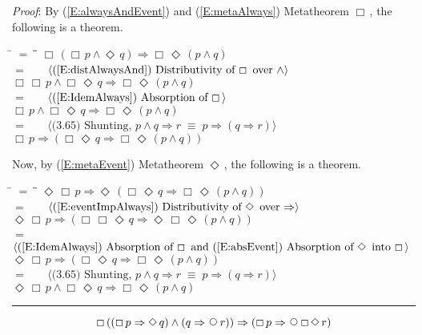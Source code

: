 \documentclass[12pt, fleqn, leqno]{article}
\newcommand{\lgap}{2pt}                             %
\newcommand{\mymathindent}{24pt}                    %
\newcommand{\equivs}{\ensuremath{\;\equiv\;}}       %
\newcommand{\impl}{\ensuremath{\Rightarrow}}        %
\newcommand{\Next}{\;\,\text{\raisebox{3.5pt}{\circle{6}}}}
\newcommand{\Event}{\Diamond\,}
\newcommand{\Always}{\Box\,}
\newcommand{\myqed}{\rule[-.23ex]{1.2ex}{2.0ex}}
\newcommand{\myqedtab}{\hspace{384pt}}              %
\newcommand{\Gll} {\langle}                         %
\newcommand{\Ggg} {\rangle}                         %
\newcommand{\Hint}[1]     {\ \ \ $\Gll              \mbox{#1} \Ggg$ }   %
\begin{document}
\emph{Proof}: By (\ref{E:alwaysAndEvent}) and (\ref{E:metaAlways}) Metatheorem $\Always$, the following is a theorem.
\begin{tabbing}
\hspace{\mymathindent} \= $= \;$ \= \myqedtab \= \kill
\> \>   $\Always (\Always p \land \Event q) \impl \Always\Event (p \land q)$\\[\lgap]
\> $=$  \>  \Hint{(\ref{E:distAlwaysAnd}) Distributivity of $\Always$ over $\land$}\\[\lgap]
\> \>   $\Always \Always p \land \Always\Event q \impl \Always\Event (p \land q)$\\[\lgap]
\> $=$  \>  \Hint{(\ref{E:IdemAlways}) Absorption of $\Always$}\\[\lgap]
\> \>   $\Always p \land \Always\Event q \impl \Always\Event (p \land q)$\\[\lgap]
\> $=$  \>  \Hint{(3.65) Shunting, $p\land q\impl r\equivs p\impl (q\impl r)$}\\[\lgap]
\> \>   $\Always p \impl (\Always\Event q \impl \Always\Event (p \land q))$
\end{tabbing}
Now, by (\ref{E:metaEvent}) Metatheorem $\Event$, the following is a theorem.
\begin{tabbing}
\hspace{\mymathindent} \= $= \;$ \= \myqedtab \= \kill
\> \>   $\Event\Always p \impl \Event(\Always\Event q \impl \Always\Event (p \land q))$\\[\lgap]
\> $=$  \>  \Hint{(\ref{E:eventImpAlways}) Distributivity of $\Event$ over $\impl$}\\[\lgap]
\> \>   $\Event\Always p \impl (\Always\Always\Event q \impl \Event\Always\Event (p \land q))$\\[\lgap]
\> $=$  \>  \Hint{(\ref{E:IdemAlways}) Absorption of $\Always$ and (\ref{E:absEvent}) Absorption of $\Event$ into $\Always$}\\[\lgap]
\> \>   $\Event\Always p \impl (\Always\Event q \impl \Always\Event (p \land q))$\\[\lgap]
\> $=$  \>  \Hint{(3.65) Shunting, $p\land q\impl r\equivs p\impl (q\impl r)$}\\[\lgap]
\> \>   $\Event\Always p\land \Always\Event q \impl \Always\Event (p\land q)$ \quad \myqed
\end{tabbing}
\begin{equation}\label{E:kroger49}
 \Always ((\Always p \impl \Event q) \land (q \impl \Next r)) \impl (\Always p \impl \Next \Always \Event r)
\end{equation}
\end{document}
